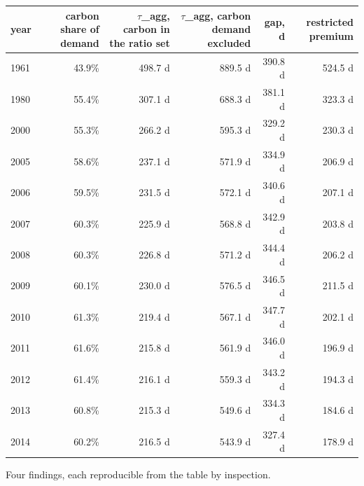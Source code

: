 \documentclass[11pt]{article}
\begin{document}
\begin{longtable}{@{}l|r|r|r|r|r@{}}
\toprule
year & carbon share of demand & \(\tau\)\_agg, carbon in the ratio set & \(\tau\)\_agg, carbon demand excluded & gap, d & restricted premium \\
\midrule
1961 & 43.9\% & 498.7 d & 889.5 d & 390.8 d & 524.5 d \\
1980 & 55.4\% & 307.1 d & 688.3 d & 381.1 d & 323.3 d \\
2000 & 55.3\% & 266.2 d & 595.3 d & 329.2 d & 230.3 d \\
2005 & 58.6\% & 237.1 d & 571.9 d & 334.9 d & 206.9 d \\
2006 & 59.5\% & 231.5 d & 572.1 d & 340.6 d & 207.1 d \\
2007 & 60.3\% & 225.9 d & 568.8 d & 342.9 d & 203.8 d \\
2008 & 60.3\% & 226.8 d & 571.2 d & 344.4 d & 206.2 d \\
2009 & 60.1\% & 230.0 d & 576.5 d & 346.5 d & 211.5 d \\
2010 & 61.3\% & 219.4 d & 567.1 d & 347.7 d & 202.1 d \\
2011 & 61.6\% & 215.8 d & 561.9 d & 346.0 d & 196.9 d \\
2012 & 61.4\% & 216.1 d & 559.3 d & 343.2 d & 194.3 d \\
2013 & 60.8\% & 215.3 d & 549.6 d & 334.3 d & 184.6 d \\
2014 & 60.2\% & 216.5 d & 543.9 d & 327.4 d & 178.9 d \\
\bottomrule
\end{longtable}

Four findings, each reproducible from the table by inspection.
\end{document}
